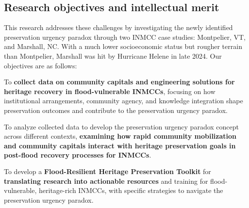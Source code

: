 \documentclass[11pt]{article}
\begin{document}
\subsection{Research objectives and intellectual merit}
This research addresses these challenges by investigating the newly identified preservation urgency paradox through two INMCC case studies: Montpelier, VT, and Marshall, NC. With a much lower socioeconomic status but rougher terrain than Montpelier, Marshall was hit by Hurricane Helene in late 2024. 
Our objectives are as follows:
\vspace{-0.4cm}
\begin{gitemizecollect}
\item To \textbf{collect data on community capitals and engineering solutions for heritage recovery in flood-vulnerable INMCCs}, focusing on how institutional arrangements, community agency, and knowledge integration shape preservation outcomes and contribute to the preservation urgency paradox. 
\end{gitemizecollect}
\begin{gitemizeanalyze}
\item To analyze collected data to develop the preservation urgency paradox concept across different contexts,\textbf{ examining how rapid community mobilization and community capitals interact with heritage preservation goals in post-flood recovery processes for INMCCs}.
\end{gitemizeanalyze}
\vspace{-0.6cm}
\begin{gitemizeflow}
\item To develop a \textbf{Flood-Resilient Heritage Preservation Toolkit} for \textbf{translating research into actionable resources} and training for flood-vulnerable, heritage-rich INMCCs, with specific strategies to navigate the preservation urgency paradox.
\end{gitemizeflow}
\vspace{-0.2cm}
\end{document}

